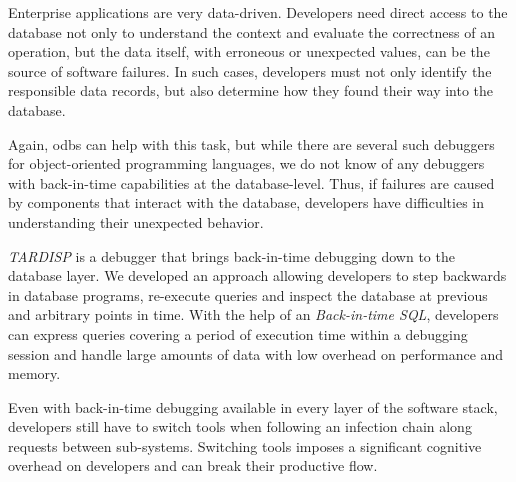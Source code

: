 
Enterprise applications are very data-driven.
Developers need direct access to the database not only to understand the context and evaluate the correctness of an operation, but the data itself, with erroneous or unexpected values, can be the source of software failures.
In such cases, developers must not only identify the responsible data records, but also determine how they found their way into the database.

Again, \acp{odb} can help with this task, but
while there are several such debuggers for object-oriented programming languages, we do not know of any debuggers with back-in-time capabilities at the database-level.
Thus, if failures are caused by components that interact with the database, developers have difficulties in understanding their unexpected behavior.

\emph{TARDISP} is a debugger that brings back-in-time debugging down to the database layer.
We developed an approach allowing developers to step backwards in database programs, re-execute queries and inspect the database at previous and arbitrary points in time.
With the help of an \emph{Back-in-time SQL}, developers can express queries covering a period of execution time within a debugging session and handle large amounts of data with low overhead on performance and memory. 

\bigskip\noindent

Even with back-in-time debugging available in every layer of the software stack, developers still have to switch tools when following an infection chain along requests between sub-systems.
Switching tools imposes a significant cognitive overhead on developers and can break their productive flow.


